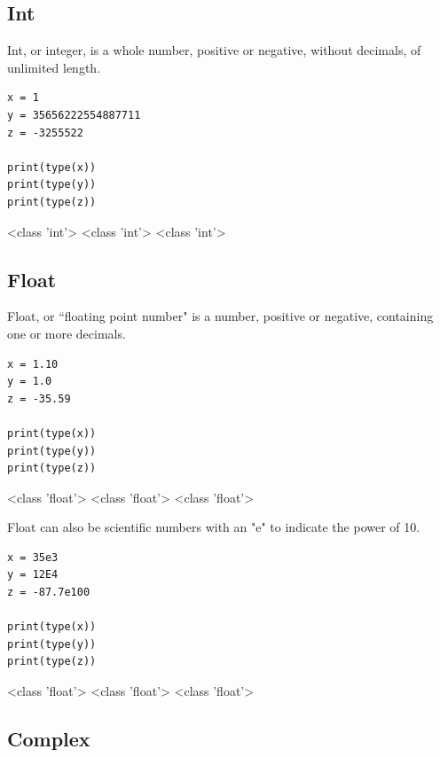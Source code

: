 \documentclass[12pt,a4paper]{article}
\begin{document}
\subsection{Int}
Int, or integer, is a whole number, positive or negative, without
decimals, of unlimited length.

\begin{ebox}
	\begin{lstlisting}
x = 1
y = 35656222554887711
z = -3255522

print(type(x))
print(type(y))
print(type(z))
	\end{lstlisting}
\tcblower
	\begin{vercode}
<class 'int'>
<class 'int'>
<class 'int'>
	\end{vercode}
\end{ebox}
\subsection{Float}
Float, or ``floating point number" is a number, positive or negative,
containing one or more decimals.

\begin{ebox}
	\begin{lstlisting}
x = 1.10
y = 1.0
z = -35.59

print(type(x))
print(type(y))
print(type(z))
	\end{lstlisting}
\tcblower
	\begin{vercode}
<class 'float'>
<class 'float'>
<class 'float'>
	\end{vercode}
\end{ebox}

Float can also be scientific numbers with
an "e" to indicate the power of 10.

\begin{ebox}
	\begin{lstlisting}
x = 35e3
y = 12E4
z = -87.7e100

print(type(x))
print(type(y))
print(type(z))
	\end{lstlisting}
\tcblower
	\begin{vercode}
<class 'float'>
<class 'float'>
<class 'float'>
	\end{vercode}
\end{ebox}
\subsection{Complex}
\end{document}
